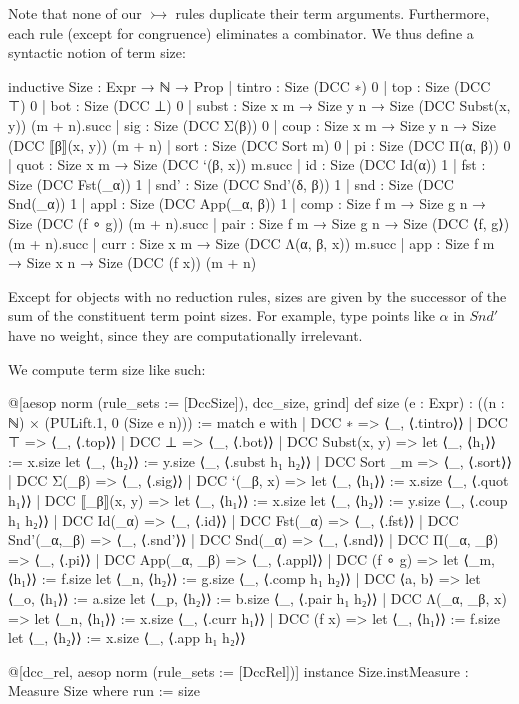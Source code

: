 \documentclass{article}
\newcommand{\affarr}{\rightarrowtail}
\begin{document}
Note that none of our \(\affarr\) rules duplicate their term arguments. Furthermore, each rule (except for congruence) eliminates a combinator. We thus define a syntactic notion of term size:

\begin{leancode}
inductive Size : Expr → ℕ → Prop
  | tintro : Size (DCC ∗) 0
  | top    : Size (DCC ⊤) 0
  | bot    : Size (DCC ⊥) 0
  | subst  : Size x m → Size y n → Size (DCC Subst(x, y)) (m + n).succ
  | sig    : Size (DCC Σ(β)) 0
  | coup   : Size x m → Size y n → Size (DCC ⟦β⟧(x, y)) (m + n)
  | sort   : Size (DCC Sort m) 0
  | pi     : Size (DCC Π(α, β)) 0
  | quot   : Size x m → Size (DCC `(β, x)) m.succ
  | id     : Size (DCC Id(α)) 1
  | fst    : Size (DCC Fst(_α)) 1
  | snd'   : Size (DCC Snd'(δ, β)) 1
  | snd    : Size (DCC Snd(_α)) 1
  | appl   : Size (DCC App(_α, β)) 1
  | comp   : Size f m → Size g n → Size (DCC (f ∘ g)) (m + n).succ
  | pair   : Size f m → Size g n → Size (DCC ⟨f, g⟩) (m + n).succ
  | curr   : Size x m → Size (DCC Λ(α, β, x)) m.succ
  | app    : Size f m → Size x n → Size (DCC (f x)) (m + n)
\end{leancode}

Except for objects with no reduction rules, sizes are given by the successor of the sum of the constituent term point sizes. For example, type points like \(\alpha\) in \(Snd'\) have no weight, since they are computationally irrelevant.

We compute term size like such:

\begin{leancode}
@[aesop norm (rule_sets := [DccSize]), dcc_size, grind]
def size (e : Expr) : ((n : ℕ) × (PULift.{1, 0} (Size e n))) :=
  match e with
  | DCC ∗ => ⟨_, ⟨.tintro⟩⟩
  | DCC ⊤ => ⟨_, ⟨.top⟩⟩
  | DCC ⊥ => ⟨_, ⟨.bot⟩⟩
  | DCC Subst(x, y) =>
    let ⟨_, ⟨h₁⟩⟩ := x.size
    let ⟨_, ⟨h₂⟩⟩ := y.size
    ⟨_, ⟨.subst h₁ h₂⟩⟩
  | DCC Sort _m => ⟨_, ⟨.sort⟩⟩
  | DCC Σ(_β) => ⟨_, ⟨.sig⟩⟩
  | DCC `(_β, x) =>
    let ⟨_, ⟨h₁⟩⟩ := x.size
    ⟨_, ⟨.quot h₁⟩⟩
  | DCC ⟦_β⟧(x, y) =>
    let ⟨_, ⟨h₁⟩⟩ := x.size
    let ⟨_, ⟨h₂⟩⟩ := y.size
    ⟨_, ⟨.coup h₁ h₂⟩⟩
  | DCC Id(_α)      => ⟨_, ⟨.id⟩⟩
  | DCC Fst(_α) => ⟨_, ⟨.fst⟩⟩
  | DCC Snd'(_α,_β) => ⟨_, ⟨.snd'⟩⟩
  | DCC Snd(_α) => ⟨_, ⟨.snd⟩⟩
  | DCC Π(_α, _β) => ⟨_, ⟨.pi⟩⟩
  | DCC App(_α, _β) => ⟨_, ⟨.appl⟩⟩
  | DCC (f ∘ g) =>
    let ⟨_m, ⟨h₁⟩⟩ := f.size
    let ⟨_n, ⟨h₂⟩⟩ := g.size
    ⟨_, ⟨.comp h₁ h₂⟩⟩
  | DCC ⟨a, b⟩ =>
    let ⟨_o, ⟨h₁⟩⟩ := a.size
    let ⟨_p, ⟨h₂⟩⟩ := b.size
    ⟨_, ⟨.pair h₁ h₂⟩⟩
  | DCC Λ(_α, _β, x) =>
    let ⟨_n, ⟨h₁⟩⟩ := x.size
    ⟨_, ⟨.curr h₁⟩⟩
  | DCC (f x) =>
    let ⟨_, ⟨h₁⟩⟩ := f.size
    let ⟨_, ⟨h₂⟩⟩ := x.size
    ⟨_, ⟨.app h₁ h₂⟩⟩

@[dcc_rel, aesop norm (rule_sets := [DccRel])]
instance Size.instMeasure : Measure Size where
  run := size
\end{leancode}
\end{document}
